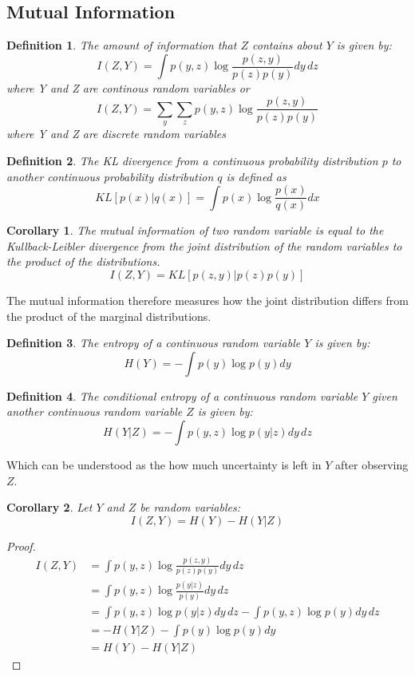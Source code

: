 \documentclass[11pt,oneside,openright]{report}
\newtheorem{definition}{Definition}
\newtheorem{corollary}{Corollary}
\begin{document}
\subsection{Mutual Information}

\begin{definition}
The amount of information that $Z$ contains about $Y$ is given by:
$$ I(Z, Y) = \int p(y, z) \log \frac{p(z, y)}{p(z)p(y)} dy\,dz $$ where Y and Z are continous random variables or 
 $$ I(Z, Y) = \sum_y \sum_z p(y, z) \log \frac{p(z, y)}{p(z)p(y)} $$ where Y and Z are discrete random variables 
\end{definition}

\begin{definition}
The KL divergence from a continuous probability distribution $p$ to another continuous probability distribution $q$ is defined as 
$$ KL[p(x)|q(x)] = \int p(x) \log \frac{p(x)}{q(x)} dx $$
\end{definition}

\begin{corollary}
The mutual information of two random variable is equal to the Kullback-Leibler divergence from the joint distribution of the random variables to the product of the distributions.
$$ I(Z, Y) = KL[p(z, y) | p(z)p(y)] $$
\end{corollary}
The mutual information therefore measures how the joint distribution differs from the product of the marginal distributions. 

\begin{definition}
The entropy of a continuous random variable $Y$ is given by:
$$ H(Y)  = -\int p(y) \log p(y) dy $$
\end{definition}

\begin{definition}
The conditional entropy of a continuous random variable $Y$ given another continuous random variable $Z$ is given by:
$$ H(Y|Z)  = -\int p(y, z) \log p(y|z) dy\,dz $$
\end{definition}
Which can be understood as the how much uncertainty is left in $Y$ after observing $Z$.

\begin{corollary}
Let $Y$ and $Z$ be random variables:
\begin{equation}
I(Z, Y) = H(Y) - H(Y|Z)
\label{eq:mutual_info_cond_entropy}
\end{equation}
\end{corollary}

\begin{proof}
\begin{align}
I(Z, Y) &= \int p(y, z) \log \frac{p(z, y)}{p(z)p(y)} dy\,dz\\
& = \int p(y, z) \log \frac{p(y|z)}{p(y)} dy\,dz \label{eq:mi_zy}\\
&= \int p(y, z) \log p(y|z) dy\,dz - \int p(y, z) \log p(y) dy\,dz\\ 
&= - H(Y|Z) - \int p(y) \log p(y) dy\\ 
&= H(Y) - H(Y|Z)
\end{align}
\end{proof}
\end{document}
